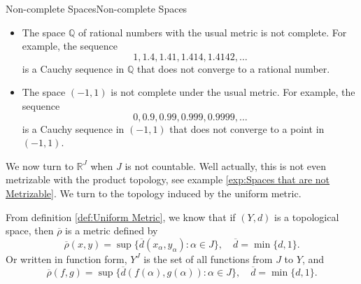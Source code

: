 \documentclass[../main.tex]{subfiles}
\begin{document}
\begin{example}{Non-complete Spaces}{Non-complete Spaces}
	\begin{itemize}
		\item The space $\mathbb{Q}$ of rational numbers with the usual metric is not complete. For example, the sequence
			\begin{equation*}
				1, 1.4, 1.41, 1.414, 1.4142, \ldots
			\end{equation*}
			is a Cauchy sequence in $\mathbb{Q}$ that does not converge to a rational number.
		\item The space $(-1,1)$ is not complete under the usual metric. For example, the sequence
			\begin{equation*}
				0, 0.9, 0.99, 0.999, 0.9999, \ldots
			\end{equation*}
			is a Cauchy sequence in $(-1,1)$ that does not converge to a point in $(-1,1)$.
	\end{itemize}
\end{example}

We now turn to $\mathbb{R}^J$ when $J$ is not countable. Well actually, this is not even metrizable with the product topology, see example \ref{exp:Spaces that are not Metrizable}. We turn to the topology induced by the uniform metric.

From definition \ref{def:Uniform Metric}, we know that if $(Y,d)$ is a topological space, then $\overline{\rho}$ is a metric defined by
\begin{equation}
	\overline{\rho}(x,y) = \sup \{\overline{d}(x_{\alpha}, y_{\alpha}) : \alpha \in J \}, \quad \overline{d} = \min \{d,1\}.
\end{equation}
Or written in function form, $Y^J$ is the set of all functions from $J$ to $Y$, and
\begin{equation}
	\overline{\rho}(f,g) = \sup \{\overline{d}(f(\alpha), g(\alpha)) : \alpha \in J \}, \quad \overline{d} = \min \{d,1\}.
\end{equation}
\end{document}
